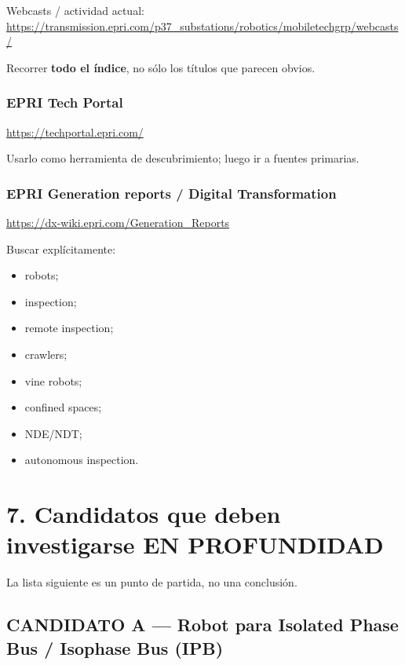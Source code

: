 \documentclass[11pt,a4paper]{article}
\begin{document}
Webcasts / actividad actual: \\
\url{https://transmission.epri.com/p37_substations/robotics/mobiletechgrp/webcasts/}

Recorrer \textbf{todo el índice}, no sólo los títulos que parecen obvios.


\subsubsection*{EPRI Tech Portal}
\url{https://techportal.epri.com/}

Usarlo como herramienta de descubrimiento; luego ir a fuentes primarias.


\subsubsection*{EPRI Generation reports / Digital Transformation}
\url{https://dx-wiki.epri.com/Generation_Reports}

Buscar explícitamente:

\begin{itemize}
\item robots;
\item inspection;
\item remote inspection;
\item crawlers;
\item vine robots;
\item confined spaces;
\item NDE/NDT;
\item autonomous inspection.
\end{itemize}


\section*{7. Candidatos que deben investigarse EN PROFUNDIDAD}
La lista siguiente es un punto de partida, no una conclusión.


\subsection*{CANDIDATO A — Robot para Isolated Phase Bus / Isophase Bus (IPB)}
\end{document}

